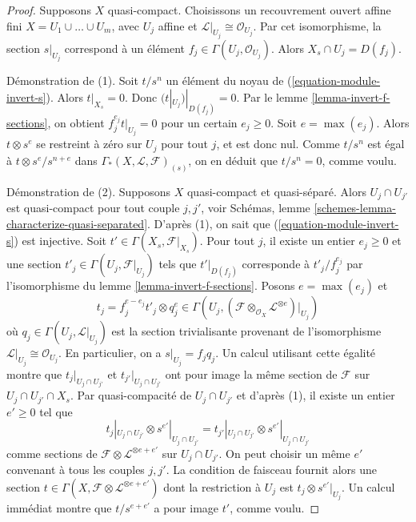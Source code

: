 \begin{proof}
Supposons $X$ quasi-compact. Choisissons un recouvrement ouvert affine fini
$X = U_1 \cup \ldots \cup U_m$, avec $U_j$ affine et
$\mathcal{L}|_{U_j} \cong \mathcal{O}_{U_j}$. Par cet isomorphisme,
la section $s|_{U_j}$ correspond à un élément
$f_j \in \Gamma(U_j, \mathcal{O}_{U_j})$. Alors
$X_s \cap U_j = D(f_j)$.

\medskip\noindent
Démonstration de (1). Soit $t/s^n$ un élément du noyau de
(\ref{equation-module-invert-s}). Alors $t|_{X_s} = 0$.
Donc $(t|_{U_j})|_{D(f_j)} = 0$. Par
le lemme \ref{lemma-invert-f-sections}, on obtient
$f_j^{e_j} t|_{U_j} = 0$ pour un certain
$e_j \geq 0$. Soit $e = \max(e_j)$. Alors $t \otimes s^e$
se restreint à zéro sur $U_j$ pour tout $j$, et est donc nul. Comme $t/s^n$
est égal à $t \otimes s^e/s^{n + e}$ dans
$\Gamma_*(X, \mathcal{L}, \mathcal{F})_{(s)}$, on en déduit que $t/s^n = 0$,
comme voulu.

\medskip\noindent
Démonstration de (2). Supposons $X$ quasi-compact et quasi-séparé.
Alors $U_j \cap U_{j'}$ est quasi-compact pour tout couple $j, j'$, voir
Schémas, lemme \ref{schemes-lemma-characterize-quasi-separated}.
D'après (1), on sait que (\ref{equation-module-invert-s}) est injective.
Soit $t' \in \Gamma(X_s, \mathcal{F}|_{X_s})$. Pour tout $j$, il existe un
entier $e_j \geq 0$ et une section $t'_j \in \Gamma(U_j, \mathcal{F}|_{U_j})$ tels que
$t'|_{D(f_j)}$ corresponde à $t'_j/f_j^{e_j}$
par l'isomorphisme du lemme \ref{lemma-invert-f-sections}.
Posons $e = \max(e_j)$ et
$$
t_j = f_j^{e - e_j} t'_j \otimes q_j^e \in
\Gamma(U_j,
(\mathcal{F} \otimes_{\mathcal{O}_X} \mathcal{L}^{\otimes e})|_{U_j})
$$
où $q_j \in \Gamma(U_j, \mathcal{L}|_{U_j})$ est la section
trivialisante provenant de l'isomorphisme
$\mathcal{L}|_{U_j} \cong \mathcal{O}_{U_j}$. En particulier, on a
$s|_{U_j} = f_j q_j$. Un calcul utilisant cette égalité montre que
$t_j|_{U_j \cap U_{j'}}$ et $t_{j'}|_{U_j \cap U_{j'}}$
ont pour image la même section de $\mathcal{F}$ sur $U_j \cap U_{j'} \cap X_s$.
Par quasi-compacité de $U_j \cap U_{j'}$ et d'après (1), il existe un
entier $e' \geq 0$ tel que
$$
t_j|_{U_j \cap U_{j'}} \otimes s^{e'}|_{U_j \cap U_{j'}} =
t_{j'}|_{U_j \cap U_{j'}} \otimes s^{e'}|_{U_j \cap U_{j'}}
$$
comme sections de $\mathcal{F} \otimes \mathcal{L}^{\otimes e + e'}$ sur
$U_j \cap U_{j'}$. On peut choisir un même $e'$ convenant à tous les couples
$j, j'$. La condition de faisceau fournit alors une section
$t \in \Gamma(X, \mathcal{F} \otimes \mathcal{L}^{\otimes e + e'})$
dont la restriction à $U_j$ est $t_j \otimes s^{e'}|_{U_j}$.
Un calcul immédiat montre que $t/s^{e + e'}$ a pour image $t'$,
comme voulu.
\end{proof}

